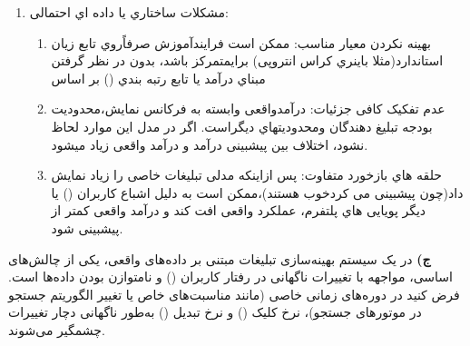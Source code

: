 \documentclass[12pt]{article}
\begin{document}
\begin{enumerate}
{\begin{enumerate}
\begin{enumerate}
\begin{itemize}
                \item اگرثبت کلیک هایااکشن هاکامل نباشدیاباتأخیرانجام شود،مدل الگوهاي نادرستی یادمی گیرد.
                \item اگر تبدیل () به روش غلط نسبت داده شود (مثلا اتریبیوشن کلیک آخر ممکن است
                بعضی تبدیلها را به درستی نشمارد)، برچسب  دقیقاً بیانگر رفتار واقعی کاربر نخواهد بود.
            \end{itemize}
        \end{enumerate}
        \item مشکلات ساختاري یا داده اي احتمالی:
        \begin{enumerate}
            \item بهینه نکردن معیار مناسب: ممکن است فرایندآموزش صرفاًروي تابع زیان استاندارد(مثلا باینري کراس انتروپی) برايمتمرکز 
            باشد، بدون در نظر گرفتن مبناي درآمد یا تابع رتبه بندي () بر اساس 
            \item عدم تفکیک کافی جزئیات: درآمدواقعی وابسته به فرکانس نمایش،محدودیت بودجه تبلیغ دهندگان ومحدودیتهاي دیگراست.
            اگر در مدل این موارد لحاظ نشود، اختلاف بین پیشبینی درآمد و درآمد واقعی زیاد میشود.
            \item حلقه هاي بازخورد متفاوت: پس ازاینکه مدلی تبلیغات خاصی را زیاد نمایش داد(چون پیشبینی می کردخوب هستند)،ممکن است به
            دلیل اشباع کاربران () یا دیگر پویایی هاي پلتفرم، عملکرد واقعی افت کند و درآمد واقعی  کمتر از پیشبینی شود.
        \end{enumerate}
    \end{enumerate}}
    
    \textbf{ج)}
    در یک سیستم بهینه‌سازی تبلیغات مبتنی بر داده‌های واقعی، یکی از چالش‌های اساسی، مواجهه با تغییرات ناگهانی در رفتار کاربران () و نامتوازن بودن داده‌ها است. فرض کنید در دوره‌های زمانی خاصی (مانند مناسبت‌های خاص یا تغییر الگوریتم جستجو در موتورهای جستجو)، نرخ کلیک () و نرخ تبدیل () به‌طور ناگهانی دچار تغییرات چشمگیر می‌شوند.
    

\end{enumerate}
\end{document}

